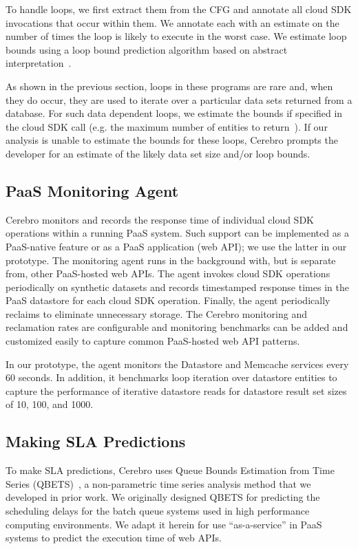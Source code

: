 To handle loops, we first extract them from the CFG and 
annotate all cloud SDK invocations that occur within them.
We annotate each with an estimate on the number of times
the loop is likely to execute in the worst case. 
We estimate loop bounds using a loop bound prediction algorithm 
based on abstract interpretation~\cite{bygde2010static}. 


As shown in the previous section, loops in these programs 
are rare and, when they do occur, they are
used to iterate over a particular data sets returned from a database.
For such data dependent loops, we estimate the bounds if specified 
in the cloud SDK call (e.g. the maximum number of 
entities to return~\cite{gae-fetch-options}).
If our analysis is unable to estimate the bounds for these loops, Cerebro prompts
the developer for an estimate of the likely data set size and/or loop bounds.

\subsection{PaaS Monitoring Agent}
Cerebro monitors and records the response time of individual
cloud SDK operations within a running PaaS system.  Such support can be 
implemented as a PaaS-native feature or as
a PaaS application (web API); we use the latter in our prototype.
The monitoring agent runs in the background with, but is separate from, 
other PaaS-hosted web APIs.
The agent invokes cloud SDK operations periodically on synthetic datasets and 
records timestamped response times in the PaaS datastore for each cloud SDK
operation.
Finally, the agent periodically reclaims
to eliminate unnecessary storage. The Cerebro monitoring and reclamation 
rates are configurable and monitoring benchmarks can be added and customized
easily to capture common PaaS-hosted web API patterns.

In our prototype, the agent monitors the Datastore and Memcache services
every 60 seconds.  In addition, it 
benchmarks loop iteration over datastore entities to capture
the performance of iterative datastore reads for datastore result set sizes 
of 10, 100, and 1000.

\subsection{Making SLA Predictions}

To make SLA predictions, Cerebro uses 
Queue Bounds Estimation from Time Series (QBETS)~\cite{Nurmi:2007:QQB:1791551.1791556},
a non-parametric time series analysis method that we developed in prior work.
We originally designed QBETS for
predicting the scheduling delays for the batch queue systems 
used in high performance computing environments. 
We adapt it herein for use ``as-a-service'' in PaaS systems 
to predict the execution time of web APIs.

